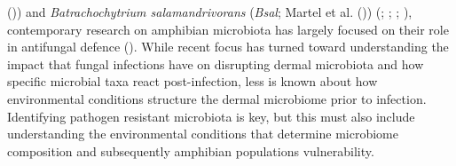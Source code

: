 \documentclass[
  12pt,
]{article}
\begin{document}
()) and
\emph{Batrachochytrium salamandrivorans} (\emph{Bsal}; {Martel et al.}
())
(;
;
; ), contemporary research on amphibian microbiota has
largely focused on their role in antifungal defence
(). While recent focus
has turned toward understanding the impact that fungal infections have
on disrupting dermal microbiota and how specific microbial taxa react
post-infection, less is known about how environmental conditions
structure the dermal microbiome prior to infection. Identifying pathogen
resistant microbiota is key, but this must also include understanding
the environmental conditions that determine microbiome composition and
subsequently amphibian populations vulnerability.
\end{document}
